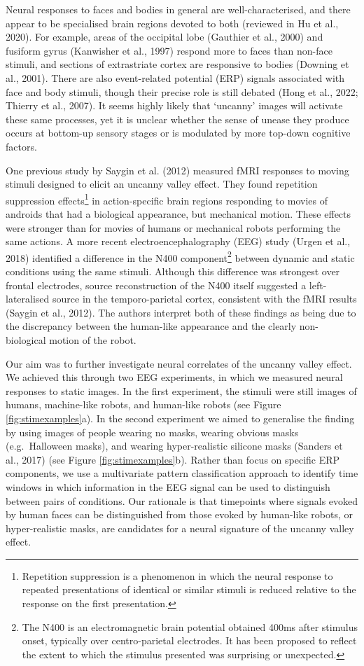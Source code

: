 \documentclass[
]{article}
\begin{document}
Neural responses to faces and bodies in general are well-characterised, and there appear to be specialised brain regions devoted to both (reviewed in Hu et al., 2020). For example, areas of the occipital lobe (Gauthier et al., 2000) and fusiform gyrus (Kanwisher et al., 1997) respond more to faces than non-face stimuli, and sections of extrastriate cortex are responsive to bodies (Downing et al., 2001). There are also event-related potential (ERP) signals associated with face and body stimuli, though their precise role is still debated (Hong et al., 2022; Thierry et al., 2007). It seems highly likely that `uncanny' images will activate these same processes, yet it is unclear whether the sense of unease they produce occurs at bottom-up sensory stages or is modulated by more top-down cognitive factors.

One previous study by Saygin et al. (2012) measured fMRI responses to moving stimuli designed to elicit an uncanny valley effect. They found repetition suppression effects\footnote{Repetition suppression is a phenomenon in which the neural response to repeated presentations of identical or similar stimuli is reduced relative to the response on the first presentation.} in action-specific brain regions responding to movies of androids that had a biological appearance, but mechanical motion. These effects were stronger than for movies of humans or mechanical robots performing the same actions. A more recent electroencephalography (EEG) study (Urgen et al., 2018) identified a difference in the N400 component\footnote{The N400 is an electromagnetic brain potential obtained 400ms after stimulus onset, typically over centro-parietal electrodes. It has been proposed to reflect the extent to which the stimulus presented was surprising or unexpected.} between dynamic and static conditions using the same stimuli. Although this difference was strongest over frontal electrodes, source reconstruction of the N400 itself suggested a left-lateralised source in the temporo-parietal cortex, consistent with the fMRI results (Saygin et al., 2012). The authors interpret both of these findings as being due to the discrepancy between the human-like appearance and the clearly non-biological motion of the robot.

Our aim was to further investigate neural correlates of the uncanny valley effect. We achieved this through two EEG experiments, in which we measured neural responses to static images. In the first experiment, the stimuli were still images of humans, machine-like robots, and human-like robots (see Figure \ref{fig:stimexamples}a). In the second experiment we aimed to generalise the finding by using images of people wearing no masks, wearing obvious masks (e.g.~Halloween masks), and wearing hyper-realistic silicone masks (Sanders et al., 2017) (see Figure \ref{fig:stimexamples}b). Rather than focus on specific ERP components, we use a multivariate pattern classification approach to identify time windows in which information in the EEG signal can be used to distinguish between pairs of conditions. Our rationale is that timepoints where signals evoked by human faces can be distinguished from those evoked by human-like robots, or hyper-realistic masks, are candidates for a neural signature of the uncanny valley effect.
\end{document}
